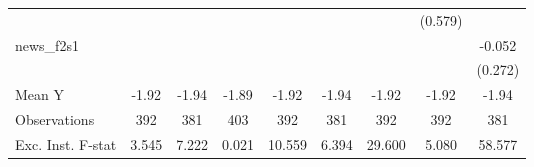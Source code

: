 {\begin{tabular}{l*{8}{c}}
            &                     &                     &                     &                     &                     &                     &     (0.579)         &                     \\
\addlinespace
news\_f2s1   &                     &                     &                     &                     &                     &                     &                     &      -0.052         \\
            &                     &                     &                     &                     &                     &                     &                     &     (0.272)         \\
\midrule
Mean Y      &       -1.92         &       -1.94         &       -1.89         &       -1.92         &       -1.94         &       -1.92         &       -1.92         &       -1.94         \\
Observations&         392         &         381         &         403         &         392         &         381         &         392         &         392         &         381         \\
Exc. Inst. F-stat&       3.545         &       7.222         &       0.021         &      10.559         &       6.394         &      29.600         &       5.080         &      58.577         \\
\bottomrule
\end{tabular}
}
